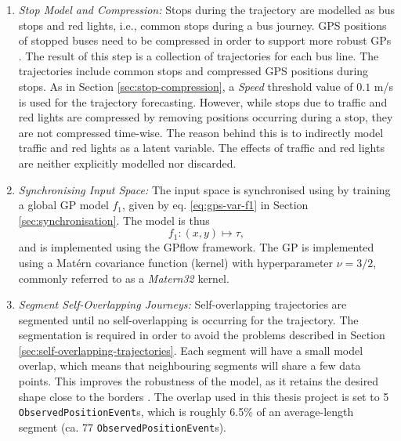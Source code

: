 \begin{enumerate}
    \item \textit{Stop Model and Compression:}
    Stops during the trajectory are modelled as bus stops and red lights, i.e., common stops during a bus journey.
    GPS positions of stopped buses need to be compressed in order to support more robust GPs \cite{Tiger2018-gp-motion-pattern}.
    The result of this step is a collection of trajectories for each bus line.
    The trajectories include common stops and compressed GPS positions during stops.
    As in Section \ref{sec:stop-compression}, a \textit{Speed} threshold value of $0.1$ m/s is used for the trajectory forecasting.
    However, while stops due to traffic and red lights are compressed by removing positions occurring during a stop, they are not compressed time-wise.
    The reason behind this is to indirectly model traffic and red lights as a latent variable.
    The effects of traffic and red lights are neither explicitly modelled nor discarded.

    \item \textit{Synchronising Input Space:}
    The input space is synchronised using by training a global GP model $f_1$, given by eq. \ref{eq:gps-var-f1} in Section \ref{sec:synchronisation}.
    The model is thus
    \begin{equation*} \label{eq:gps-var-f1}
        f_1: (x, y) \longmapsto \tau,
    \end{equation*}
    and is implemented using the GPflow \cite{GPflow2017} framework.
    The GP is implemented using a Matérn covariance function (kernel) with hyperparameter $\nu =3/2$, commonly referred to as a \textit{Matern32} kernel.

    \item \textit{Segment Self-Overlapping Journeys:}
    Self-overlapping trajectories are segmented until no self-overlapping is occurring for the trajectory.
    The segmentation is required in order to avoid the problems described in Section \ref{sec:self-overlapping-trajectories}.
    Each segment will have a small model overlap, which means that neighbouring segments will share a few data points.
    This improves the robustness of the model, as it retains the desired shape close to the borders \cite{Tiger2018-gp-motion-pattern}.
    The overlap used in this thesis project is set to 5 \texttt{ObservedPositionEvent}s, which is roughly 6.5\% of an average-length segment (ca. 77 \texttt{ObservedPositionEvent}s).
\end{enumerate}

